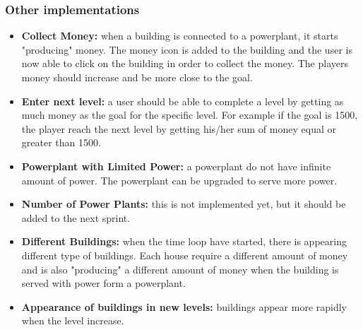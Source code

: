 	\subsubsection{Other implementations}
		\begin{itemize}
			\item {\bf Collect Money: } when a building is connected to a powerplant, it starts
			"producing" money. The money icon is added to the building and the user is now
			able to click on the building in order to collect the money. The players money
			should increase and be more close to the goal. 
			\item {\bf Enter next level: } a user should be able to complete a level by getting
			as much money as the goal for the specific level. For example if the goal is 1500, the
			player reach the next level by getting his/her sum of money equal or greater than 1500.
			\item {\bf Powerplant with Limited Power: } a powerplant do not have infinite amount of
			power. The powerplant can be upgraded to serve more power. 
			\item {\bf Number of Power Plants: } this is not implemented yet, but it should be added
			to the next sprint. 
			\item {\bf Different Buildings: } when the time loop have started, there is appearing
			different type of buildings. Each house require a different amount of money and is
			also "producing" a different amount of money when the building is served with power
			form a powerplant. 
			\item {\bf Appearance of buildings in new levels: } buildings appear more rapidly 
			when the level increase. 
		\end{itemize}
	
